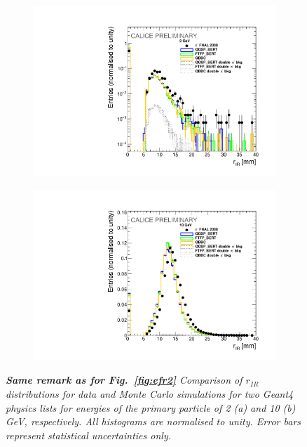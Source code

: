 \begin{figure}[H]
	\centering
	\begin{subfigure}{0.5\textwidth}
		\centering
		\includegraphics[width=.90\linewidth]{ECAL/plots/r-ir-2.pdf}
		\caption{\label{fig:rir2} }
	\end{subfigure}%
	\begin{subfigure}{0.5\textwidth}
		\centering
		\includegraphics[width=.90\linewidth]{ECAL/plots/r-ir-10.pdf}
		\caption{\label{fig:rir10} }
	\end{subfigure}
	\caption{\label{fig:rirexample} \sl {\bf Same remark as for Fig.~\ref{fig:efr2} } Comparison of $r_{IR}$ distributions for data and Monte Carlo simulations for two {\sc Geant}4 physics lists for energies of the primary particle of 2 (a) and 10 (b) GeV, respectively. All histograms are normalised to unity. Error bars represent statistical uncertainties only.}
\end{figure}

